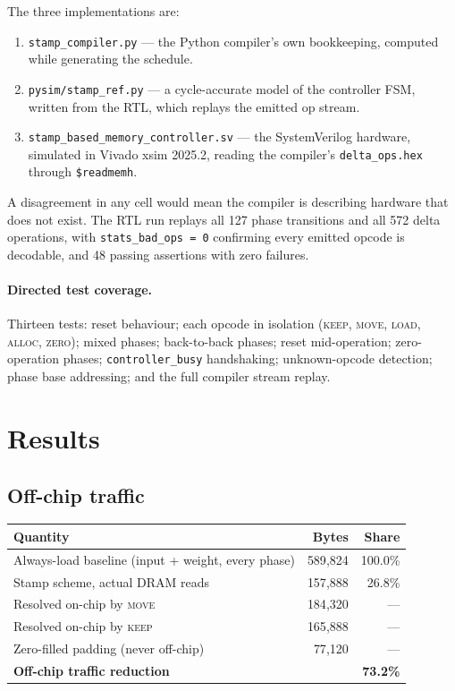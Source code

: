 \documentclass[11pt,a4paper]{article}
\newcommand{\op}[1]{\textsc{#1}}
\begin{document}
\noindent
The three implementations are:
\begin{enumerate}[leftmargin=1.4em,itemsep=2pt]
  \item \texttt{stamp\_compiler.py} --- the Python compiler's own bookkeeping,
        computed while generating the schedule.
  \item \texttt{pysim/stamp\_ref.py} --- a cycle-accurate model of the
        controller FSM, written from the RTL, which replays the emitted op
        stream.
  \item \texttt{stamp\_based\_memory\_controller.sv} --- the SystemVerilog
        hardware, simulated in Vivado xsim 2025.2, reading the compiler's
        \texttt{delta\_ops.hex} through \texttt{\$readmemh}.
\end{enumerate}

A disagreement in any cell would mean the compiler is describing hardware that
does not exist. The RTL run replays all 127 phase transitions and all 572 delta
operations, with \texttt{stats\_bad\_ops = 0} confirming every emitted opcode is
decodable, and 48 passing assertions with zero failures.

\paragraph{Directed test coverage.} Thirteen tests: reset behaviour; each
opcode in isolation (\op{keep}, \op{move}, \op{load}, \op{alloc}, \op{zero});
mixed phases; back-to-back phases; reset mid-operation; zero-operation phases;
\texttt{controller\_busy} handshaking; unknown-opcode detection; phase base
addressing; and the full compiler stream replay.

\section{Results}

\subsection{Off-chip traffic}

\begin{center}
\small
\begin{tabular}{@{}lrr@{}}
\toprule
\textbf{Quantity} & \textbf{Bytes} & \textbf{Share} \\
\midrule
Always-load baseline (input + weight, every phase) & 589{,}824 & 100.0\% \\
Stamp scheme, actual DRAM reads                    & 157{,}888 & 26.8\% \\
\midrule
Resolved on-chip by \op{move}                      & 184{,}320 & --- \\
Resolved on-chip by \op{keep}                      & 165{,}888 & --- \\
Zero-filled padding (never off-chip)               &  77{,}120 & --- \\
\midrule
\textbf{Off-chip traffic reduction}                & \multicolumn{2}{r}{\textbf{73.2\%}} \\
\bottomrule
\end{tabular}
\end{center}
\end{document}
